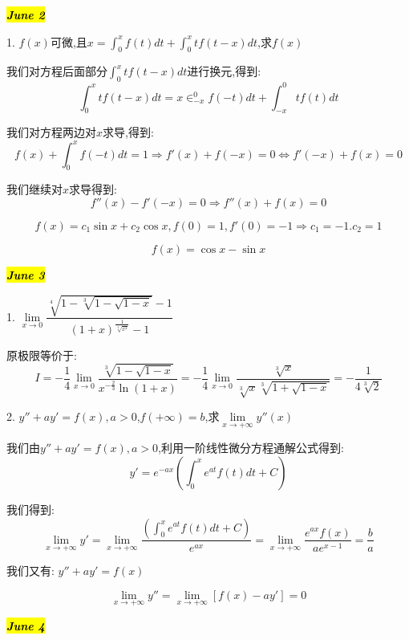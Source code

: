 \hl{\textbf{\textit{June 2}}}

1. $f(x)$可微,且$x=\int_{0}^{x}f(t)dt+\int_{0}^{x}tf(t-x)dt$,求$f(x)$
\begin{solution}
	
	我们对方程后面部分$\int_{0}^{x}tf(t-x)dt$进行换元,得到: 
	$$\int_{0}^{x}tf(t-x)dt=x\in_{-x}^{0}f(-t)dt+\int_{-x}^{0}tf(t)dt$$
	
	我们对方程两边对$x$求导,得到: 
	$$f(x)+\int_{0}^{x}f(-t)dt=1\Rightarrow f'(x)+f(-x)=0\Leftrightarrow f'(-x)+f(x)=0$$
	
	我们继续对$x$求导得到: 
	$$f''(x)-f'(-x)=0\Rightarrow f''(x)+f(x)=0$$
	
	$$f(x)=c_{1}\sin x+c_{2}\cos x,f(0)=1,f'(0)=-1\Rightarrow c_{1}=-1.c_{2}=1$$
	
	$$f(x)=\cos x-\sin x$$
\end{solution}

\hl{\textbf{\textit{June 3}}}

1. $\lim\limits_{x\rightarrow 0}\dfrac{\sqrt[4]{1-\sqrt[3]{1-\sqrt{1-x}}}-1}{(1+x)^{\frac{1}{\sqrt[3]{x^2}}}-1}$
\begin{solution}
	
	原极限等价于: 
	$$I=-\frac{1}{4}\lim\limits_{x\rightarrow 0}\dfrac{\sqrt[3]{1-\sqrt{1-x}}}{x^{-\frac{2}{3}}\ln(1+x)}=-\frac{1}{4}\lim\limits_{x\rightarrow 0}\dfrac{\sqrt[3]{x}}{\sqrt[3]{x}\sqrt[3]{1+\sqrt{1-x}}}=-\frac{1}{4\sqrt[3]{2}}$$
\end{solution}

2. $y''+ay'=f(x),a>0$,$f(+\infty)=b$,求$\lim\limits_{x\rightarrow +\infty}y''(x)$
\begin{solution}
	
	我们由$y''+ay'=f(x),a>0$,利用一阶线性微分方程通解公式得到: 
	$$y'=e^{-ax}\left(\int_{0}^{x}e^{at}f(t)dt+C \right) $$
	
	我们得到: 
	$$\lim\limits_{x\rightarrow +\infty}y'=\lim\limits_{x\rightarrow +\infty}\dfrac{\left(\int_{0}^{x}e^{at}f(t)dt+C \right)}{e^{ax}}=\lim\limits_{x\rightarrow +\infty}\dfrac{e^{ax}f(x)}{ae^{x-1}}=\dfrac{b}{a}$$
	
	我们又有: $y''+ay'=f(x)$
	
	$$\lim\limits_{x\rightarrow +\infty}y''=\lim\limits_{x\rightarrow +\infty}[f(x)-ay']=0$$
\end{solution}

\hl{\textbf{\textit{June 4}}}

